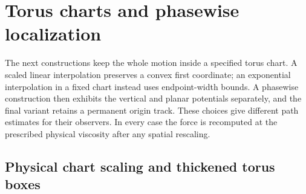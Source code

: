 \section{Torus charts and phasewise localization}\label{sec:torus-routing}

The next constructions keep the whole motion inside a specified torus
chart. A scaled linear interpolation preserves a convex first coordinate;
an exponential interpolation in a fixed chart instead uses endpoint-width
bounds. A phasewise construction then exhibits the vertical and planar
potentials separately, and the final variant retains a permanent origin
track. These choices give different path estimates for their observers.
In every case the force is recomputed at the prescribed physical viscosity
after any spatial rescaling.

\subsection{Physical chart scaling and thickened torus boxes}

